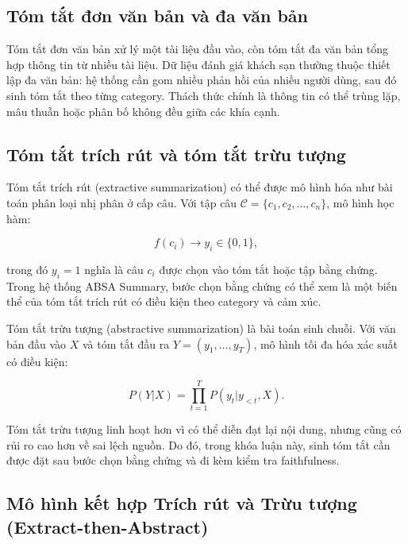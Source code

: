\subsection{Tóm tắt đơn văn bản và đa văn bản}
\label{subsec:dev-chap2-single-multi-doc}

Tóm tắt đơn văn bản xử lý một tài liệu đầu vào, còn tóm tắt đa văn bản tổng hợp thông tin từ nhiều tài liệu. Dữ liệu đánh giá khách sạn thường thuộc thiết lập đa văn bản: hệ thống cần gom nhiều phản hồi của nhiều người dùng, sau đó sinh tóm tắt theo từng category. Thách thức chính là thông tin có thể trùng lặp, mâu thuẫn hoặc phân bố không đều giữa các khía cạnh.

\subsection{Tóm tắt trích rút và tóm tắt trừu tượng}
\label{subsec:dev-chap2-extractive-abstractive}

Tóm tắt trích rút (extractive summarization) có thể được mô hình hóa như bài toán phân loại nhị phân ở cấp câu. Với tập câu $\mathcal{C}=\{c_1,c_2,\ldots,c_n\}$, mô hình học hàm:

\begin{equation}
f(c_i) \rightarrow y_i \in \{0,1\},
\label{eq:dev-chap2-extractive}
\end{equation}

trong đó $y_i=1$ nghĩa là câu $c_i$ được chọn vào tóm tắt hoặc tập bằng chứng. Trong hệ thống ABSA Summary, bước chọn bằng chứng có thể xem là một biến thể của tóm tắt trích rút có điều kiện theo category và cảm xúc.

Tóm tắt trừu tượng (abstractive summarization) là bài toán sinh chuỗi. Với văn bản đầu vào $X$ và tóm tắt đầu ra $Y=(y_1,\ldots,y_T)$, mô hình tối đa hóa xác suất có điều kiện:

\begin{equation}
P(Y|X)=\prod_{t=1}^{T}P(y_t|y_{<t},X).
\label{eq:dev-chap2-abstractive}
\end{equation}

Tóm tắt trừu tượng linh hoạt hơn vì có thể diễn đạt lại nội dung, nhưng cũng có rủi ro cao hơn về sai lệch nguồn. Do đó, trong khóa luận này, sinh tóm tắt cần được đặt sau bước chọn bằng chứng và đi kèm kiểm tra faithfulness.

\subsection{Mô hình kết hợp Trích rút và Trừu tượng (Extract-then-Abstract)}
\label{subsec:dev-chap2-extract-then-abstract}

